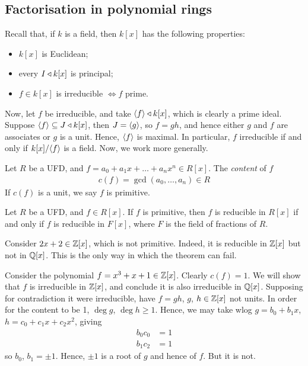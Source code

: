 \documentclass{../template/note}
\begin{document}
    \subsection{Factorisation in polynomial rings}

    Recall that, if $k$ is a field, then $k[x]$ has the following properties:
    \begin{itemize}
        \item $k[x]$ is Euclidean;
        \item every $I \triangleleft k[x]$ is principal;
        \item $f \in k[x]$ is irreducible $\iff f$ prime.
    \end{itemize}
    
    Now, let $f$ be irreducible, and take $\left \langle f \right \rangle \triangleleft k[x]$, which is clearly a prime ideal. Suppose $\left \langle f \right \rangle \subseteq J \triangleleft k[x]$, then $J = \left \langle g \right \rangle$, so $f = gh$, and hence either $g$ and $f$ are associates or $g$ is a unit. Hence, $\left \langle f \right \rangle$ is maximal. In particular, $f$ irreducible if and only if $k[x] /\!\left \langle f \right \rangle$ is a field. Now, we work more generally.
    
    \begin{definition}
        Let $R$ be a UFD, and $f = a_0 + a_1x + \dots + a_nx^n \in R[x]$. The \emph{content} of $f$
        \begin{align*}
            c(f) = \gcd(a_0, \dots, a_n) \in R
        \end{align*}
        If $c(f)$ is a unit, we say $f$ is primitive.        
    \end{definition}
    
    \begin{theorem}
        Let $R$ be a UFD, and $f \in R[x]$. If $f$ is primitive, then $f$ is reducible in $R[x]$ if and only if $f$ is reducible in $F[x]$, where $F$ is the field of fractions of $R$.
    \end{theorem}
    
    \begin{example*}
        Consider $2x+2 \in \mathbb Z[x]$, which is not primitive. Indeed, it is reducible in $\mathbb Z[x]$ but not in $\mathbb Q[x]$. This is the only way in which the theorem can fail.
    \end{example*}

    
    \begin{example*}
        Consider the polynomial $f = x^3+x+1 \in \mathbb Z[x]$. Clearly $c(f) = 1$. We will show that $f$ is irreducible in $\mathbb Z[x]$, and conclude it is also irreducible in $\mathbb Q[x]$. Supposing for contradiction it were irreducible, have $f=gh$, $g$, $h \in \mathbb Z[x]$ not units. In order for the content to be 1, $\deg g$, $\deg h \geq 1$. Hence, we may take wlog $g = b_0 + b_1x$, $h = c_0 + c_1x + c_2x^2$, giving
        \begin{align*}
            b_0c_0 &= 1 \\
            b_1c_2 &= 1
        \end{align*}
        so $b_0$, $b_1 = \pm 1$. Hence, $\pm 1$ is a root of $g$ and hence of $f$. But it is not.        
    \end{example*}
    
\end{document}
